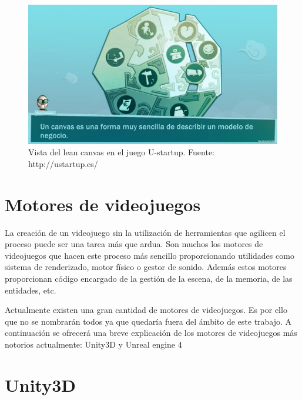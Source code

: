 \begin{description}
\begin{figure}
\begin{center}
\includegraphics[scale=0.6]{imagenes/ustartup01.jpg}
\caption{Vista del lean canvas en el juego U-startup.  Fuente: http://ustartup.es/}
\label{ustartup01}
\end{center}
\end{figure}

\end{description}


\section{Motores de videojuegos}

La creación de un videojuego sin la utilización de herramientas que agilicen el proceso puede ser una tarea más que ardua. Son muchos los motores de videojuegos que hacen este proceso más sencillo proporcionando utilidades como sistema de renderizado, motor físico o gestor de sonido. Además estos motores proporcionan código encargado de la gestión de la escena, de la memoria, de las entidades, etc.

Actualmente existen una gran cantidad de motores de videojuegos. Es por ello que no se nombrarán todos ya que quedaría fuera del ámbito de este trabajo. A continuación se ofrecerá una breve explicación de los motores de videojuegos más notorios actualmente: Unity3D y Unreal engine 4

\section{Unity3D}


